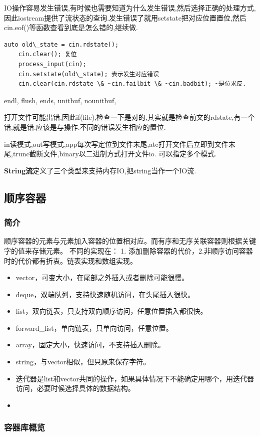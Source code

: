 IO操作容易发生错误,有时候也需要知道为什么发生错误,然后选择正确的处理方式,因此iostream提供了流状态的查询.发生错误了就用setstate把对应位置置位,然后cin.eof()等函数查看到底是怎么错的,继续做.
\begin{lstlisting}[caption={}]
	auto old\_state = cin.rdstate();
	cin.clear(); 复位
	process_input(cin);
	cin.setstate(old\_state); 表示发生对应错误
	cin.clear(cin.rdstate \& ~cin.failbit \& ~cin.badbit); ~是位求反.
\end{lstlisting}

endl, flush, ends, unitbuf, nounitbuf,

打开文件可能出错,因此if(file),检查一下是对的,其实就是检查前文的rdstate,有一个错,就是错.应该是与操作.不同的错误发生相应的置位.

in读模式,out写模式,app每次写定位到文件末尾,ate打开文件后立即到文件末尾,trunc截断文件,binary以二进制方式打开文件io. 可以指定多个模式.

\textbf{String流}定义了三个类型来支持内存IO,把string当作一个IO流.

\subsection{顺序容器}
\subsubsection{简介}
顺序容器的元素与元素加入容器的位置相对应。而有序和无序关联容器则根据关键字的值来存储元素。
不同的实现在：
	1. 添加删除容器的代价，2.非顺序访问容器时的代价都有折衷。链表实现和数组实现。
\begin{itemize}
	\item vector，可变大小，在尾部之外插入或者删除可能很慢。
	\item deque，双端队列，支持快速随机访问，在头尾插入很快。
	\item list，双向链表，只支持双向顺序访问，任意位置插入都很快。
	\item forward\_list，单向链表，只单向访问，任意位置。
	\item array，固定大小，快速访问，不支持插入删除。
	\item string，与vector相似，但只原来保存字符。
	\item 迭代器是list和vector共同的操作，如果具体情况下不能确定用哪个，用迭代器访问，必要时候选择具体的数据结构。
	\item 
\end{itemize}

\subsubsection{容器库概览}




